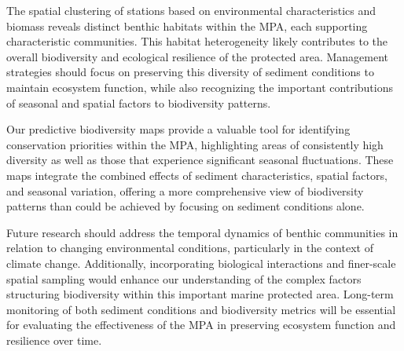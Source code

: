 \documentclass[12pt]{article}
\begin{document}
\qquad The spatial clustering of stations based on environmental characteristics and biomass reveals distinct benthic habitats within the MPA, each supporting characteristic communities. This habitat heterogeneity likely contributes to the overall biodiversity and ecological resilience of the protected area. Management strategies should focus on preserving this diversity of sediment conditions to maintain ecosystem function, while also recognizing the important contributions of seasonal and spatial factors to biodiversity patterns.

\qquad Our predictive biodiversity maps provide a valuable tool for identifying conservation priorities within the MPA, highlighting areas of consistently high diversity as well as those that experience significant seasonal fluctuations. These maps integrate the combined effects of sediment characteristics, spatial factors, and seasonal variation, offering a more comprehensive view of biodiversity patterns than could be achieved by focusing on sediment conditions alone.

\qquad Future research should address the temporal dynamics of benthic communities in relation to changing environmental conditions, particularly in the context of climate change. Additionally, incorporating biological interactions and finer-scale spatial sampling would enhance our understanding of the complex factors structuring biodiversity within this important marine protected area. Long-term monitoring of both sediment conditions and biodiversity metrics will be essential for evaluating the effectiveness of the MPA in preserving ecosystem function and resilience over time.



\newpage






\end{document}
